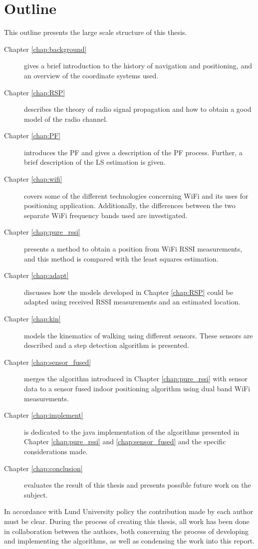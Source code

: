 \documentclass{LTHthesis}
\begin{document}
\section{Outline}
%
This outline presents the large scale structure of this thesis.
%
\begin{description}
\item[Chapter \ref{chap:background}] gives a brief introduction to the history of navigation and positioning, and an overview of the coordinate systems used.  
%
\item[Chapter \ref{chap:RSP}] describes the theory of radio signal propagation and how to obtain a good model of the radio channel. 
%
\item[Chapter \ref{chap:PF}] introduces the PF and gives a description of the PF process. Further, a brief description of the LS estimation is given. 
%
\item[Chapter \ref{chap:wifi}] covers some of the different technologies concerning WiFi and its uses for positioning application. Additionally, the differences between the two separate WiFi frequency bands used are investigated. 
%
\item[Chapter \ref{chap:pure_rssi}] presents a method to obtain a position from WiFi RSSI measurements, and this method is compared with the least squares estimation.  
%
\item[Chapter \ref{chap:adapt}] discusses how the models developed in Chapter \ref{chap:RSP} could be adapted using received RSSI measurements and an estimated location.
%
\item[Chapter \ref{chap:kin}] models the kinematics of walking using different sensors. These sensors are described and a step detection algorithm is presented. 
%
\item[Chapter \ref{chap:sensor_fused}] merges the algorithm introduced in Chapter \ref{chap:pure_rssi} with sensor data to a sensor fused indoor positioning algorithm using dual band WiFi measurements.
%
\item[Chapter \ref{chap:implement}] is dedicated to the java implementation of the algorithms presented in Chapter \ref{chap:pure_rssi} and \ref{chap:sensor_fused} and the specific considerations made. 
%
\item[Chapter \ref{chap:conclusion}] evaluates the result of this thesis and presents possible future work on the subject. 
%
\end{description}
%
In accordance with Lund University policy the contribution made by each author must be clear. During the process of creating this thesis, all work has been done in collaboration between the authors, both concerning the process of developing and implementing the algorithms, as well as condensing the work into this report. 
%
\end{document}
